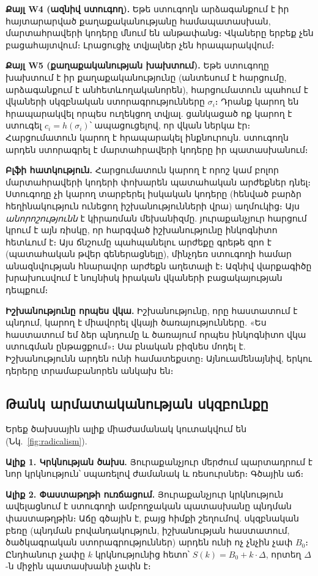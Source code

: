 \documentclass[11pt,a4paper,twocolumn]{article}
\begin{document}
\textbf{Քայլ W4 (ազնիվ ստուգող).} Եթե ստուգողն արձագանքում է իր հայտարարված քաղաքականությանը համապատասխան, մարտահրավերի կոդերը մնում են անթափանց։ Վկաները երբեք չեն բացահայտվում։ Լրացուցիչ տվյալներ չեն հրապարակվում։

\textbf{Քայլ W5 (քաղաքականության խախտում).} Եթե ստուգողը խախտում է իր քաղաքականությունը (անտեսում է հարցումը, արձագանքում է անհետևողականորեն), հարցումատուն պահում է վկաների սկզբնական ստորագրությունները $\sigma_i$։ Դրանք կարող են հրապարակվել որպես ուղեկցող տվյալ. ցանկացած ոք կարող է ստուգել $c_i = h(\sigma_i)$՝ ապացուցելով, որ վկան ներկա էր։ Հարցումատուն կարող է հրապարակել ինքնուրույն. ստուգողն արդեն ստորագրել է մարտահրավերի կոդերը իր պատասխանում։

\textbf{Բլֆի հատկություն.} Հարցումատուն կարող է որոշ կամ բոլոր մարտահրավերի կոդերի փոխարեն պատահական արժեքներ դնել։ Ստուգողը չի կարող տարբերել իսկական կոդերը (հենված բարձր հեղինակություն ունեցող իշխանությունների վրա) աղմուկից։ Այս \emph{անորոշությունն} է կիրառման մեխանիզմը. յուրաքանչյուր հարցում կրում է այն ռիսկը, որ հարգված իշխանությունը ինկոգնիտո հետևում է։ Այս ճնշումը պահպանելու արժեքը գրեթե զրո է (պատահական թվեր գեներացնելը), մինչդեռ ստուգողի համար անազնվության հնարավոր արժեքն աղետալի է։ Ազնիվ վարքագիծը խրախուսվում է նույնիսկ իրական վկաների բացակայության դեպքում։

\textbf{Իշխանությունը որպես վկա.} Իշխանությունը, որը հաստատում է պնդում, կարող է միավորել վկայի ծառայությունները. «Ես հաստատում եմ ձեր պնդումը և ծառայում որպես ինկոգնիտո վկա ստուգման ընթացքում»։ Սա բնական բիզնես մոդել է. Իշխանությունն արդեն ունի համատեքստը։ Այնուամենայնիվ, երկու դերերը տրամաբանորեն անկախ են։

\subsection{Թանկ արմատականության սկզբունքը}

Երեք ծախսային ալիք միաժամանակ կուտակվում են (Նկ.~\ref{fig:radicalism}).

\textbf{Ալիք 1. Կրկնության ծախս.} Յուրաքանչյուր մերժում պարտադրում է նոր կրկնություն՝ սպառելով ժամանակ և ռեսուրսներ։ Գծային աճ։

\textbf{Ալիք 2. Փաստաթղթի ուռճացում.} Յուրաքանչյուր կրկնություն ավելացնում է ստուգողի ամբողջական պատասխանը պնդման փաստաթղթին։ Աճը գծային է, բայց հիմքի շեղումով. սկզբնական բեռը (պնդման բովանդակություն, իշխանության հաստատում, ծածկագրական ստորագրություններ) արդեն ունի ոչ չնչին չափ $B_0$։ Ընդհանուր չափը $k$ կրկնությունից հետո՝ $S(k) = B_0 + k \cdot \Delta$, որտեղ $\Delta$-ն միջին պատասխանի չափն է։
\end{document}

